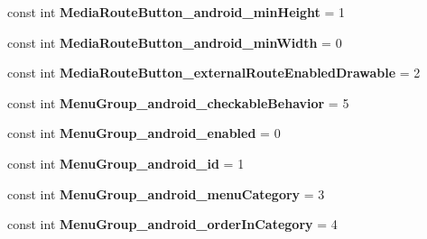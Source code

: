 \begin{DoxyCompactItemize}
\item 
\hypertarget{classClient_1_1Droid_1_1Resource_1_1Styleable_a2dd72948d1745b71b300a218df4aef36}{}const int {\bfseries Media\+Route\+Button\+\_\+android\+\_\+min\+Height} = 1\label{classClient_1_1Droid_1_1Resource_1_1Styleable_a2dd72948d1745b71b300a218df4aef36}

\item 
\hypertarget{classClient_1_1Droid_1_1Resource_1_1Styleable_a732cab628a2cba16b1ed67f56d0bcc48}{}const int {\bfseries Media\+Route\+Button\+\_\+android\+\_\+min\+Width} = 0\label{classClient_1_1Droid_1_1Resource_1_1Styleable_a732cab628a2cba16b1ed67f56d0bcc48}

\item 
\hypertarget{classClient_1_1Droid_1_1Resource_1_1Styleable_abaae21256f489d3cf7805e07d7cffc44}{}const int {\bfseries Media\+Route\+Button\+\_\+external\+Route\+Enabled\+Drawable} = 2\label{classClient_1_1Droid_1_1Resource_1_1Styleable_abaae21256f489d3cf7805e07d7cffc44}

\item 
\hypertarget{classClient_1_1Droid_1_1Resource_1_1Styleable_abe5a92432e8d8f38b761c252d8a941db}{}const int {\bfseries Menu\+Group\+\_\+android\+\_\+checkable\+Behavior} = 5\label{classClient_1_1Droid_1_1Resource_1_1Styleable_abe5a92432e8d8f38b761c252d8a941db}

\item 
\hypertarget{classClient_1_1Droid_1_1Resource_1_1Styleable_a6739df1cc53eff0ad71a601583066465}{}const int {\bfseries Menu\+Group\+\_\+android\+\_\+enabled} = 0\label{classClient_1_1Droid_1_1Resource_1_1Styleable_a6739df1cc53eff0ad71a601583066465}

\item 
\hypertarget{classClient_1_1Droid_1_1Resource_1_1Styleable_af566baf02676e661c35d691d226a93c6}{}const int {\bfseries Menu\+Group\+\_\+android\+\_\+id} = 1\label{classClient_1_1Droid_1_1Resource_1_1Styleable_af566baf02676e661c35d691d226a93c6}

\item 
\hypertarget{classClient_1_1Droid_1_1Resource_1_1Styleable_a0e53673bf12b8121e391d36c6a9721fd}{}const int {\bfseries Menu\+Group\+\_\+android\+\_\+menu\+Category} = 3\label{classClient_1_1Droid_1_1Resource_1_1Styleable_a0e53673bf12b8121e391d36c6a9721fd}

\item 
\hypertarget{classClient_1_1Droid_1_1Resource_1_1Styleable_a1236de22a1ef179d2f65ebb7d1c10175}{}const int {\bfseries Menu\+Group\+\_\+android\+\_\+order\+In\+Category} = 4\label{classClient_1_1Droid_1_1Resource_1_1Styleable_a1236de22a1ef179d2f65ebb7d1c10175}


\end{DoxyCompactItemize}
